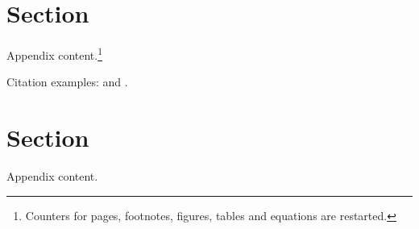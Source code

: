 \newpage
\begin{appendices}
	
\setcounter{page}{1}										%
\setcounter{footnote}{0}									%
\renewcommand{\thetable}{\thesection.\arabic{table}}		%
\renewcommand{\thefigure}{\thesection.\arabic{figure}}		%
\renewcommand{\theequation}{\thesection.\arabic{equation}}	%

\section{Section} %
\vspace{0.7cm}
\iftoggle{toclinks}{\gototoc}{} 							%
\iftoggle{cboxes}{	   				  						%
	\begin{boxeditems}
		\item To-do list.
	\end{boxeditems}}{}
\setcounter{table}{0}
\setcounter{figure}{0}
\setcounter{equation}{0}

Appendix content.\footnote{Counters for pages, footnotes, figures, tables and equations are restarted.}



Citation examples: \textcite{ChangLi:2017AER} and \parencite{ChangLi:2017AER}.


\section{Section} %
\vspace{0.7cm}
\iftoggle{toclinks}{\gototoc}{} 							%
\iftoggle{cboxes}{	   				  						%
	\begin{boxeditems}
		\item To-do list.
	\end{boxeditems}}{}
\setcounter{table}{0}
\setcounter{figure}{0}
\setcounter{equation}{0}

Appendix content.







\end{appendices}